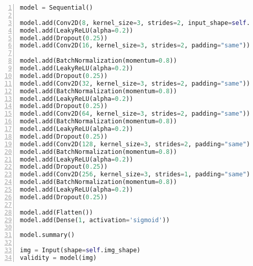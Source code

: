 
\lstset{basicstyle=\footnotesize\ttfamily,breaklines=true}
\begin{lstlisting}[language=Python,numbers=left,frame=tb,caption=Discriminator source code,label=lst:dis,xleftmargin=2em]
model = Sequential()

model.add(Conv2D(8, kernel_size=3, strides=2, input_shape=self.img_shape, padding="same"))
model.add(LeakyReLU(alpha=0.2))
model.add(Dropout(0.25))
model.add(Conv2D(16, kernel_size=3, strides=2, padding="same"))
        
model.add(BatchNormalization(momentum=0.8))
model.add(LeakyReLU(alpha=0.2))
model.add(Dropout(0.25))
model.add(Conv2D(32, kernel_size=3, strides=2, padding="same"))
model.add(BatchNormalization(momentum=0.8))
model.add(LeakyReLU(alpha=0.2))
model.add(Dropout(0.25))
model.add(Conv2D(64, kernel_size=3, strides=2, padding="same"))
model.add(BatchNormalization(momentum=0.8))
model.add(LeakyReLU(alpha=0.2))
model.add(Dropout(0.25))
model.add(Conv2D(128, kernel_size=3, strides=2, padding="same"))
model.add(BatchNormalization(momentum=0.8))
model.add(LeakyReLU(alpha=0.2))
model.add(Dropout(0.25))
model.add(Conv2D(256, kernel_size=3, strides=1, padding="same"))
model.add(BatchNormalization(momentum=0.8))
model.add(LeakyReLU(alpha=0.2))
model.add(Dropout(0.25))

model.add(Flatten())
model.add(Dense(1, activation='sigmoid'))

model.summary()

img = Input(shape=self.img_shape)
validity = model(img)

\end{lstlisting}